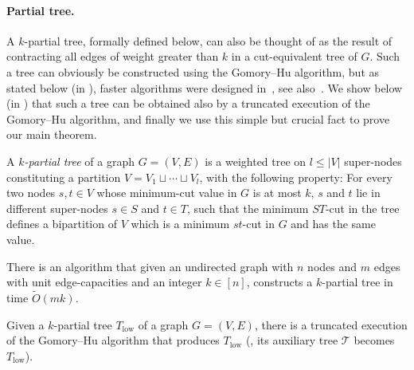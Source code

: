 \documentclass{toc}
\theoremstyle{plain}
\newcommand\tO{\ensuremath{\widetilde O}}  %
\newcommand{\T}{\mathcal{T}}
\providecommand{\card}[1]{\lvert#1\rvert}
\begin{document}
\paragraph{Partial tree.}
A $k$-partial tree, formally defined below, can also be thought of as
the result of contracting all edges of weight greater than $k$
in a cut-equivalent tree of $G$.
Such a tree can obviously be constructed using the Gomory--Hu algorithm,
but as stated below (in ),
faster algorithms were designed in~\cite{HKP07,BHKP07},
see also~\cite[Theorem $3$]{Panigrahi16}.
We show below (in ) that such a tree
can be obtained also by a truncated execution of the Gomory--Hu algorithm,
and finally we use this simple but crucial fact to prove our main theorem.


\begin{definition}
  A \emph{$k$-partial tree} of a graph $G=(V,E)$ is a weighted tree on $l\leq \card{V}$ super-nodes constituting a partition $V=V_1 \sqcup\cdots\sqcup V_l$, with the following property:
  For every two nodes $s,t\in V$ whose minimum-cut value in $G$ is at most $k$, $s$ and $t$ lie in different super-nodes $s\in S$ and $t\in T$, such that the minimum $ST$-cut in the tree defines a bipartition of $V$
  which is a minimum $st$-cut in $G$ and has the same value.
\end{definition}

\begin{lemma}
\label{Lemma:Partial}
There is an algorithm that given an undirected graph with $n$ nodes and $m$ edges with unit edge-capacities and an integer $k\in [n]$, constructs a $k$-partial tree in time $\tO(mk)$.
\end{lemma}

\begin{lemma} \label{lem:truncatedGH}
  Given a $k$-partial tree $T_{\mathrm{low}}$ of a graph $G=(V,E)$, there is a truncated execution of the Gomory--Hu algorithm that produces $T_{\mathrm{low}}$ (\ie, its auxiliary tree $\T$ becomes $T_{\mathrm{low}}$).
\end{lemma}
\end{document}
